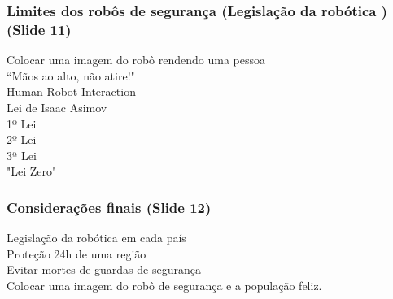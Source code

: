 \documentclass[12pt,a4paper]{article}
\begin{document}
    \subsubsection{Limites dos robôs de segurança (Legislação da robótica
    ) (Slide 11)}
    Colocar uma imagem do robô rendendo uma pessoa \\
    “Mãos ao alto, não atire!"  \\
    Human-Robot Interaction \\
    Lei de Isaac Asimov \\
        1º Lei \\
        2º Lei \\
        3ª Lei \\
        "Lei Zero" \\

    \subsubsection{Considerações finais (Slide 12)}
    Legislação da robótica em cada país \\
    Proteção 24h de uma região \\
    Evitar mortes de guardas de segurança \\
    Colocar uma imagem do robô de segurança e a população feliz.
\end{document}
